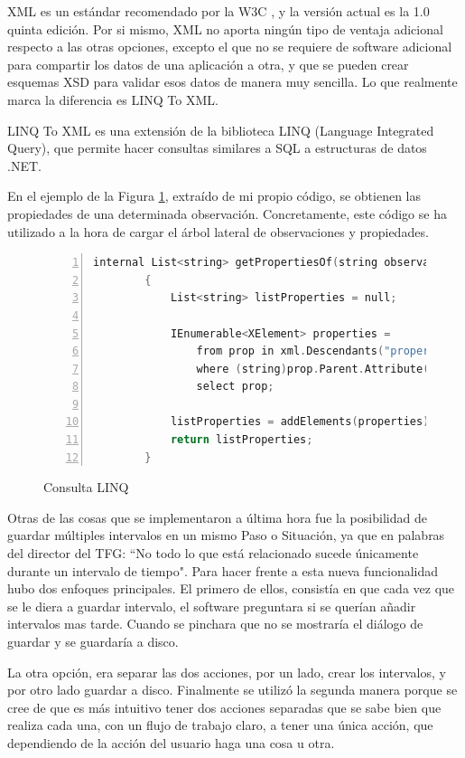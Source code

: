 XML es un est\'andar recomendado por la W3C \cite{XML:Specification}, y la versi\'on actual es la 1.0 quinta edici\'on.
Por si mismo, XML no aporta ning\'un tipo de ventaja adicional respecto a las otras opciones, excepto el que no se
requiere de software adicional para compartir los datos de una aplicaci\'on a otra, y que
se pueden crear esquemas XSD para validar esos datos de manera muy sencilla. 
Lo que realmente marca
la diferencia es LINQ To XML.

LINQ To XML es una extensi\'on de la biblioteca LINQ (Language Integrated Query), que permite hacer consultas
similares a SQL a estructuras de datos .NET. 

En el ejemplo de la Figura \ref{Consulta LINQ}, extra\'ido de mi propio c\'odigo, se obtienen las propiedades de
una determinada observaci\'on.
Concretamente, este c\'odigo se ha utilizado a la hora de cargar el \'arbol lateral
de observaciones y propiedades.

\begin{figure}[h]
	\begin{lstlisting}[tabsize=2, language=C, numbers=left, showspaces=false, breaklines=true]
		internal List<string> getPropertiesOf(string observation)
        {
            List<string> listProperties = null;
            
            IEnumerable<XElement> properties =
                from prop in xml.Descendants("property")
                where (string)prop.Parent.Attribute("name") == observation
                select prop;
            
            listProperties = addElements(properties);
            return listProperties;
        }
	\end{lstlisting}
	\caption[Consulta LINQ]{Consulta LINQ}
	\label{Consulta LINQ}
\end{figure}

Otras de las cosas que se implementaron a \'ultima hora fue la posibilidad de guardar m\'ultiples
intervalos en un mismo Paso o Situaci\'on, ya que en palabras del director del TFG: ``No todo lo que est\'a 
relacionado sucede \'unicamente durante un intervalo de tiempo". Para hacer frente a esta nueva funcionalidad
hubo dos enfoques principales. El primero de ellos, consist\'ia en que cada vez que se le diera a guardar
intervalo, el software preguntara si se quer\'ian a\~nadir intervalos mas tarde. Cuando se pinchara que no
se mostrar\'ia el di\'alogo de guardar y se guardar\'ia a disco.

La otra opci\'on, era separar las dos acciones, por un lado, crear los intervalos, y por otro lado guardar a disco.
Finalmente se utiliz\'o la segunda manera porque se cree de que es m\'as intuitivo tener dos acciones separadas
que se sabe bien que realiza cada una, con un flujo de trabajo claro, a tener una \'unica acci\'on, que dependiendo
de la acci\'on del usuario haga una cosa u otra. 

